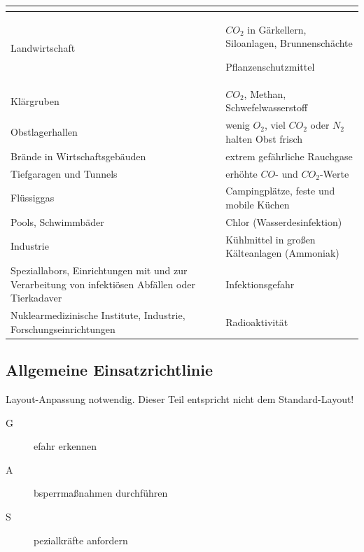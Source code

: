 \begin{tabulary}{\linewidth}{LL}\toprule
{}
\\\midrule
Landwirtschaft
 &
$CO_2$ in Gärkellern, Siloanlagen, Brunnenschächte

Pflanzenschutzmittel
\\\addlinespace
Klärgruben
 &
$CO_2$, Methan, Schwefelwasserstoff
\\\addlinespace
Obstlagerhallen
 &
wenig $O_2$, viel $CO_2$ oder $N_2$ halten Obst frisch
\\\addlinespace
Brände in Wirtschaftsgebäuden
 &
extrem gefährliche Rauchgase
\\\addlinespace
Tiefgaragen und Tunnels
 &
erhöhte $CO$- und $CO_2$-Werte
\\\addlinespace
Flüssiggas
 &
Campingplätze, feste und mobile Küchen
\\\addlinespace
Pools, Schwimmbäder
 &
Chlor (Wasserdesinfektion)
\\\addlinespace
Industrie
 &
Kühlmittel in gro{\ss}en Kälteanlagen (Ammoniak)
\\\addlinespace
Speziallabors, Einrichtungen mit und zur Verarbeitung von infektiösen
Abfällen oder Tierkadaver
 &
Infektionsgefahr
\\\addlinespace
Nuklearmedizinische Institute, Industrie, Forschungseinrichtungen
 &
Radioaktivität
\\\bottomrule
\end{tabulary}


\subsection{Allgemeine Einsatzrichtlinie}
\begin{anfxwarning}[author=GABS]{Layout-Anpassung notwendig.}
   Dieser Teil entspricht nicht dem Standard-Layout!
\end{anfxwarning}



\begin{description}
    \item[G]efahr erkennen
    \item[A]bsperrma{\ss}nahmen durchführen
    \item[S]pezialkräfte anfordern
\end{description}







